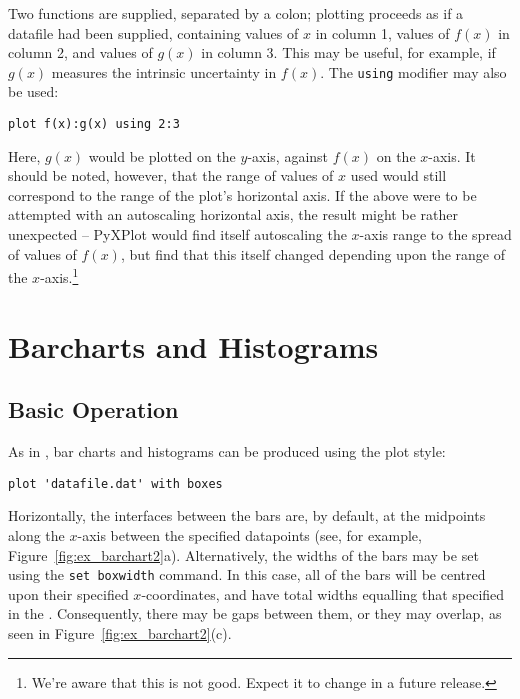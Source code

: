 \noindent Two functions are supplied, separated by a colon; plotting proceeds
as if a datafile had been supplied, containing values of $x$ in column 1,
values of $f(x)$ in column 2, and values of $g(x)$ in column 3. This may be
useful, for example, if $g(x)$ measures the intrinsic uncertainty in $f(x)$.
The {\tt using} modifier may also be used:

\begin{verbatim}
plot f(x):g(x) using 2:3
\end{verbatim}

Here, $g(x)$ would be plotted on the $y$-axis, against $f(x)$ on the $x$-axis.
It should be noted, however, that the range of values of $x$ used would still
correspond to the range of the plot's horizontal axis. If the above were to be
attempted with an autoscaling horizontal axis, the result might be rather
unexpected -- PyXPlot would find itself autoscaling the $x$-axis range to the
spread of values of $f(x)$, but find that this itself changed depending upon
the range of the $x$-axis.\footnote{We're aware that this is not good. Expect
it to change in a future release.}

\section{Barcharts and Histograms}
\label{barcharts}

\subsection{Basic Operation}

As in \gnuplot, bar charts and histograms can be produced using the
 plot style:

\begin{verbatim} 
plot 'datafile.dat' with boxes
\end{verbatim}

\noindent Horizontally, the interfaces between the bars are, by default, at the
midpoints along the $x$-axis between the specified datapoints (see, for
example, Figure~\ref{fig:ex_barchart2}a).  Alternatively, the widths of the
bars may be set using the {\tt set boxwidth} command. In this case, all of
the bars will be centred upon their specified $x$-coordinates, and have total
widths equalling that specified in the . Consequently, there may be
gaps between them, or they may overlap, as seen in
Figure~\ref{fig:ex_barchart2}(c).

